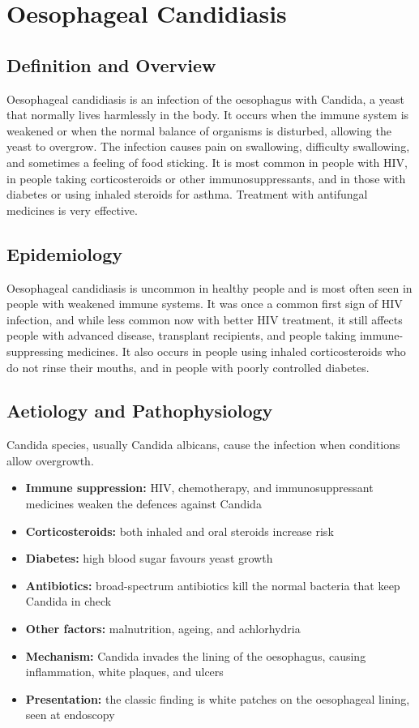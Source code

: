 \chapter{Oesophageal Candidiasis}

\section*{Definition and Overview}
Oesophageal candidiasis is an infection of the oesophagus with Candida, a yeast that normally lives harmlessly in the body. It occurs when the immune system is weakened or when the normal balance of organisms is disturbed, allowing the yeast to overgrow. The infection causes pain on swallowing, difficulty swallowing, and sometimes a feeling of food sticking. It is most common in people with HIV, in people taking corticosteroids or other immunosuppressants, and in those with diabetes or using inhaled steroids for asthma. Treatment with antifungal medicines is very effective.

\section*{Epidemiology}
Oesophageal candidiasis is uncommon in healthy people and is most often seen in people with weakened immune systems. It was once a common first sign of HIV infection, and while less common now with better HIV treatment, it still affects people with advanced disease, transplant recipients, and people taking immune-suppressing medicines. It also occurs in people using inhaled corticosteroids who do not rinse their mouths, and in people with poorly controlled diabetes.

\section*{Aetiology and Pathophysiology}
Candida species, usually Candida albicans, cause the infection when conditions allow overgrowth.
\begin{itemize}
    \item \textbf{Immune suppression:} HIV, chemotherapy, and immunosuppressant medicines weaken the defences against Candida
    \item \textbf{Corticosteroids:} both inhaled and oral steroids increase risk
    \item \textbf{Diabetes:} high blood sugar favours yeast growth
    \item \textbf{Antibiotics:} broad-spectrum antibiotics kill the normal bacteria that keep Candida in check
    \item \textbf{Other factors:} malnutrition, ageing, and achlorhydria
    \item \textbf{Mechanism:} Candida invades the lining of the oesophagus, causing inflammation, white plaques, and ulcers
    \item \textbf{Presentation:} the classic finding is white patches on the oesophageal lining, seen at endoscopy
\end{itemize}

